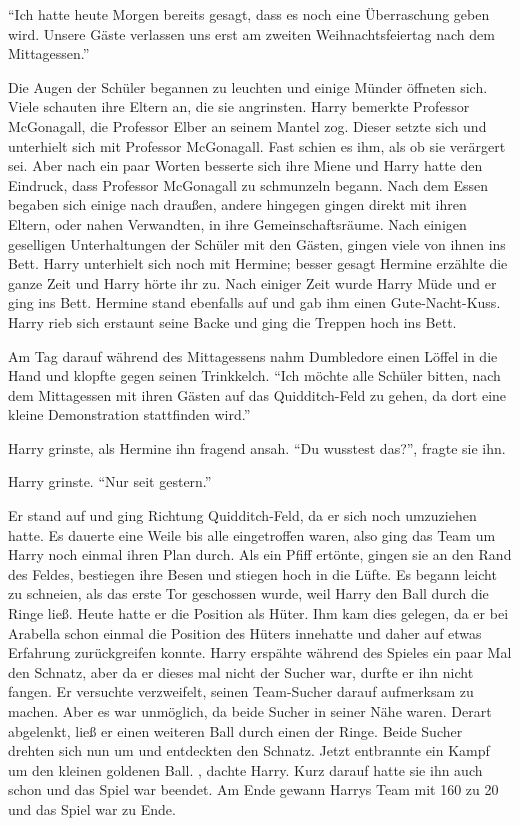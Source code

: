 \enquote{Ich hatte heute Morgen bereits gesagt, dass es noch eine Überraschung geben wird. Unsere Gäste verlassen uns erst am zweiten Weihnachtsfeiertag nach dem Mittagessen.}

Die Augen der Schüler begannen zu leuchten und einige Münder öffneten sich. Viele schauten ihre Eltern an, die sie angrinsten. Harry bemerkte Professor McGonagall, die Professor Elber an seinem Mantel zog. Dieser setzte sich und unterhielt sich mit Professor McGonagall. Fast schien es ihm, als ob sie verärgert sei. Aber nach ein paar Worten besserte sich ihre Miene und Harry hatte den Eindruck, dass Professor McGonagall zu schmunzeln begann. Nach dem Essen begaben sich einige nach draußen, andere hingegen gingen direkt mit ihren Eltern, oder nahen Verwandten, in ihre Gemeinschaftsräume. Nach einigen geselligen Unterhaltungen der Schüler mit den Gästen, gingen viele von ihnen ins Bett. Harry unterhielt sich noch mit Hermine; besser gesagt Hermine erzählte die ganze Zeit und Harry hörte ihr zu. Nach einiger Zeit wurde Harry Müde und er ging ins Bett. Hermine stand ebenfalls auf und gab ihm einen Gute-Nacht-Kuss. Harry rieb sich erstaunt seine Backe und ging die Treppen hoch ins Bett.

Am Tag darauf während des Mittagessens nahm Dumbledore einen Löffel in die Hand und klopfte gegen seinen Trinkkelch. \enquote{Ich möchte alle Schüler bitten, nach dem Mittagessen mit ihren Gästen auf das Quidditch-Feld zu gehen, da dort eine kleine Demonstration stattfinden wird.}

Harry grinste, als Hermine ihn fragend ansah. \enquote{Du wusstest das?}, fragte sie ihn.

Harry grinste. \enquote{Nur seit gestern.}

Er stand auf und ging Richtung Quidditch-Feld, da er sich noch umzuziehen hatte. Es dauerte eine Weile bis alle eingetroffen waren, also ging das Team um Harry noch einmal ihren Plan durch. Als ein Pfiff ertönte, gingen sie an den Rand des Feldes, bestiegen ihre Besen und stiegen hoch in die Lüfte. Es begann leicht zu schneien, als das erste Tor geschossen wurde, weil Harry den Ball durch die Ringe ließ. Heute hatte er die Position als Hüter. Ihm kam dies gelegen, da er bei Arabella schon einmal die Position des Hüters innehatte und daher auf etwas Erfahrung zurückgreifen konnte. Harry erspähte während des Spieles ein paar Mal den Schnatz, aber da er dieses mal nicht der Sucher war, durfte er ihn nicht fangen. Er versuchte verzweifelt, seinen Team-Sucher darauf aufmerksam zu machen. Aber es war unmöglich, da beide Sucher in seiner Nähe waren. Derart abgelenkt, ließ er einen weiteren Ball durch einen der Ringe. Beide Sucher drehten sich nun um und entdeckten den Schnatz. Jetzt entbrannte ein Kampf um den kleinen goldenen Ball. , dachte Harry.  Kurz darauf hatte sie ihn auch schon und das Spiel war beendet. Am Ende gewann Harrys Team mit 160 zu 20 und das Spiel war zu Ende.

